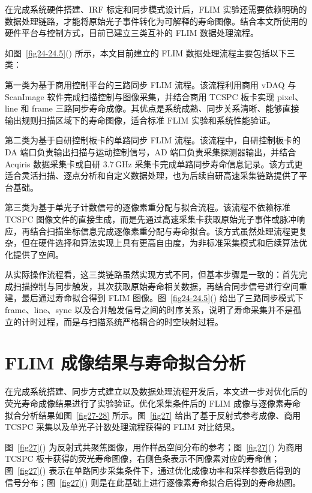 在完成系统硬件搭建、IRF 标定和同步模式设计后，FLIM 实验还需要依赖明确的数据处理链路，才能将原始光子事件转化为可解释的寿命图像。结合本文所使用的硬件平台与控制方式，目前已建立三类互补的 FLIM 数据处理流程。

如图~\ref{fig24-24.5}() 所示，本文目前建立的 FLIM 数据处理流程主要包括以下三类：

第一类为基于商用控制平台的三路同步 FLIM 流程。该流程利用商用 vDAQ 与 ScanImage 软件完成扫描控制与图像采集，并结合商用 TCSPC 板卡实现 pixel、line 和 frame 三路同步寿命成像。其优点是系统成熟、同步关系清晰、能够直接输出规则扫描区域下的寿命图像，适合标准 FLIM 实验和系统性能验证。

第二类为基于自研控制板卡的单路同步 FLIM 流程。该流程中，自研控制板卡的 DA 端口负责输出扫描与运动控制信号，AD 端口负责采集探测器输出，并结合 Acqiris 数据采集卡或自研 3.7\,GHz 采集卡完成单路同步寿命信息记录。该方式更适合灵活扫描、逐点分析和自定义数据处理，也为后续自研高速采集链路提供了平台基础。

第三类为基于单光子计数信号的逐像素重分配与拟合流程。该流程不依赖标准 TCSPC 图像文件的直接生成，而是先通过高速采集卡获取原始光子事件或脉冲响应，再结合扫描坐标信息完成逐像素重分配与寿命拟合。该方式虽然处理流程更复杂，但在硬件选择和算法实现上具有更高自由度，为非标准采集模式和后续算法优化提供了空间。

从实际操作流程看，这三类链路虽然实现方式不同，但基本步骤是一致的：首先完成扫描控制与同步触发，其次获取原始寿命相关数据，再结合同步信号进行空间重建，最后通过寿命拟合得到 FLIM 图像。图~\ref{fig24-24.5}() 给出了三路同步模式下 frame、line、sync 以及合并触发信号之间的时序关系，说明了寿命采集并不是孤立的计时过程，而是与扫描系统严格耦合的时空映射过程。


\section{FLIM 成像结果与寿命拟合分析}\label{5.5}

在完成系统搭建、同步方式建立以及数据处理流程开发后，本文进一步对优化后的荧光寿命成像结果进行了实验验证。优化采集条件后的 FLIM 成像与逐像素寿命拟合分析结果如图~\ref{fig27-28} 所示。图~\ref{fig27} 给出了基于反射式参考成像、商用 TCSPC 采集以及单光子计数处理流程获得的 FLIM 对比结果。

图~\ref{fig27}() 为反射式共聚焦图像，用作样品空间分布的参考；图~\ref{fig27}() 为商用 TCSPC 板卡获得的荧光寿命图像，右侧色条表示不同像素对应的寿命值；图~\ref{fig27}() 表示在单路同步采集条件下，通过优化成像功率和采样参数后得到的信号分布；图~\ref{fig27}() 则是在此基础上进行逐像素寿命拟合后得到的寿命热图。


